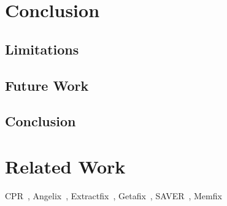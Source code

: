 \documentclass[a4paper,11pt,oneside,openany]{book}
\begin{document}

\chapter{Conclusion}

\section{Limitations}

\section{Future Work}

\section{Conclusion}
\chapter{Related Work}
CPR~\cite{CPR}, Angelix~\cite{Angelix}, Extractfix~\cite{Extractfix}, Getafix~\cite{Getafix}, SAVER~\cite{SAVER}, Memfix~\cite{Memfix}



\end{document}
